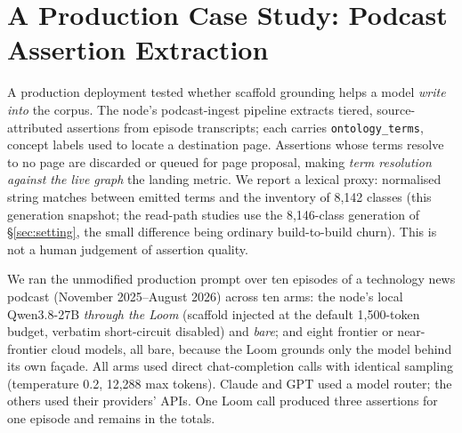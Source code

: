 \documentclass[10pt,twocolumn]{article}
\begin{document}
\section{A Production Case Study: Podcast Assertion Extraction}\label{sec:casestudy}
A production deployment tested whether scaffold grounding helps a model \emph{write into} the
corpus. The node's podcast-ingest pipeline extracts tiered, source-attributed assertions from
episode transcripts; each carries \texttt{ontology\_terms}, concept labels used to locate a
destination page. Assertions whose terms resolve to no page are discarded or queued for page
proposal, making \emph{term resolution against the live graph} the landing metric. We report a
lexical proxy: normalised string matches between emitted terms and the inventory of 8{,}142
classes (this generation snapshot; the read-path studies use the 8{,}146-class generation of
\S\ref{sec:setting}, the small difference being ordinary build-to-build churn). This is not a
human judgement of assertion quality.

We ran the unmodified production prompt over ten episodes of a technology news podcast
(November 2025--August 2026) across ten arms: the node's local Qwen3.8-27B \emph{through the
Loom} (scaffold injected at the default 1{,}500-token budget, verbatim short-circuit disabled)
and \emph{bare}; and eight frontier or near-frontier cloud models, all bare, because the Loom
grounds only the model behind its own fa\c{c}ade. All arms used direct chat-completion calls
with identical sampling (temperature 0.2, 12{,}288 max tokens). Claude and GPT used a model
router; the others used their providers' APIs. One Loom call produced three assertions for one
episode and remains in the totals.
\end{document}

